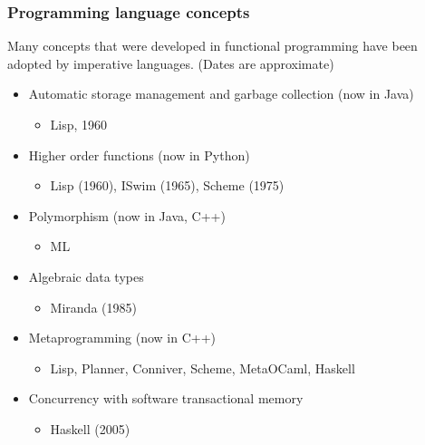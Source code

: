 \documentclass{beamer}
\begin{document}
\begin{frame}
\frametitle{Programming language concepts}

Many concepts that were developed in functional programming have
been adopted by imperative languages.  (Dates are approximate)

\begin{itemize}
\item Automatic storage management and garbage collection (now in
  Java)
  \begin{itemize}
  \item Lisp, 1960
  \end{itemize}
\item Higher order functions (now in Python)
  \begin{itemize}
  \item Lisp (1960), ISwim (1965), Scheme (1975)
  \end{itemize}
\item Polymorphism (now in Java, C++)
  \begin{itemize}
  \item ML
  \end{itemize}
\item Algebraic data types
  \begin{itemize}
  \item Miranda (1985)
  \end{itemize}
\item Metaprogramming (now in C++)
  \begin{itemize}
  \item Lisp, Planner, Conniver, Scheme, MetaOCaml, Haskell
  \end{itemize}
\item Concurrency with software transactional memory
  \begin{itemize}
  \item Haskell (2005)
  \end{itemize}
\end{itemize}

\end{frame}
\end{document}
